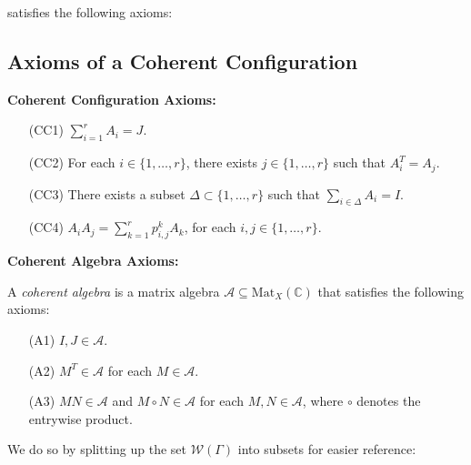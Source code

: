 \documentclass{article}
\begin{document}
satisfies the following axioms:

\subsection*{Axioms of a Coherent Configuration}

\textbf{Coherent Configuration Axioms:}

\begin{itemize}
    \item[(CC1)] \quad \( \sum_{i=1}^{r} A_i = J \).
    \item[(CC2)] \quad For each \( i \in \{1, \dots, r\} \), there exists \( j \in \{1, \dots, r\} \) such that \( A_i^T = A_j \).
    \item[(CC3)] \quad There exists a subset \( \Delta \subset \{1, \dots, r\} \) such that \( \sum_{i \in \Delta} A_i = I \).
    \item[(CC4)] \quad \( A_i A_j = \sum_{k=1}^{r} p^k_{i,j} A_k \), for each \( i, j \in \{1, \dots, r\} \).
\end{itemize}

\textbf{Coherent Algebra Axioms:}

A \textit{coherent algebra} is a matrix algebra \( \mathcal{A} \subseteq \text{Mat}_X(\mathbb{C}) \) that satisfies the following axioms:

\begin{itemize}
    \item[(A1)] \quad \( I, J \in \mathcal{A} \).
    \item[(A2)] \quad \( M^T \in \mathcal{A} \) for each \( M \in \mathcal{A} \).
    \item[(A3)] \quad \( MN \in \mathcal{A} \) and \( M \circ N \in \mathcal{A} \) for each \( M, N \in \mathcal{A} \), where \( \circ \) denotes the entrywise product.
\end{itemize}

We do so by splitting up the set $\mathcal{W}(\Gamma)$ into subsets for easier reference:
\end{document}
